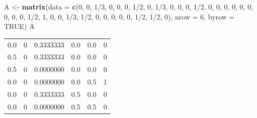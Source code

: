 \documentclass[]{article}
\newenvironment{Shaded}{\begin{snugshade}}{\end{snugshade}}
\newcommand{\KeywordTok}[1]{\textcolor[rgb]{0.13,0.29,0.53}{\textbf{{#1}}}}
\newcommand{\DataTypeTok}[1]{\textcolor[rgb]{0.13,0.29,0.53}{{#1}}}
\newcommand{\DecValTok}[1]{\textcolor[rgb]{0.00,0.00,0.81}{{#1}}}
\newcommand{\StringTok}[1]{\textcolor[rgb]{0.31,0.60,0.02}{{#1}}}
\newcommand{\OtherTok}[1]{\textcolor[rgb]{0.56,0.35,0.01}{{#1}}}
\newcommand{\NormalTok}[1]{{#1}}
\begin{document}
\begin{Shaded}
\begin{Highlighting}[]
\NormalTok{A <-}\StringTok{ }\KeywordTok{matrix}\NormalTok{(}\DataTypeTok{data =} \KeywordTok{c}\NormalTok{(}\DecValTok{0}\NormalTok{, }\DecValTok{0}\NormalTok{,  }\DecValTok{1}\NormalTok{/}\DecValTok{3}\NormalTok{,  }\DecValTok{0}\NormalTok{,   }\DecValTok{0}\NormalTok{, }\DecValTok{0}\NormalTok{, }
                          \DecValTok{1}\NormalTok{/}\DecValTok{2}\NormalTok{, }\DecValTok{0}\NormalTok{,  }\DecValTok{1}\NormalTok{/}\DecValTok{3}\NormalTok{,  }\DecValTok{0}\NormalTok{,   }\DecValTok{0}\NormalTok{, }\DecValTok{0}\NormalTok{,}
                          \DecValTok{1}\NormalTok{/}\DecValTok{2}\NormalTok{, }\DecValTok{0}\NormalTok{,  }\DecValTok{0}\NormalTok{,    }\DecValTok{0}\NormalTok{,   }\DecValTok{0}\NormalTok{, }\DecValTok{0}\NormalTok{,}
                           \DecValTok{0}\NormalTok{, }\DecValTok{0}\NormalTok{,  }\DecValTok{0}\NormalTok{,    }\DecValTok{0}\NormalTok{,   }\DecValTok{1}\NormalTok{/}\DecValTok{2}\NormalTok{, }\DecValTok{1}\NormalTok{,}
                           \DecValTok{0}\NormalTok{, }\DecValTok{0}\NormalTok{,  }\DecValTok{1}\NormalTok{/}\DecValTok{3}\NormalTok{, }\DecValTok{1}\NormalTok{/}\DecValTok{2}\NormalTok{,   }\DecValTok{0}\NormalTok{, }\DecValTok{0}\NormalTok{,}
                           \DecValTok{0}\NormalTok{, }\DecValTok{0}\NormalTok{,  }\DecValTok{0}\NormalTok{,   }\DecValTok{1}\NormalTok{/}\DecValTok{2}\NormalTok{,  }\DecValTok{1}\NormalTok{/}\DecValTok{2}\NormalTok{, }\DecValTok{0}\NormalTok{), }
                  \DataTypeTok{nrow =} \DecValTok{6}\NormalTok{,  }\DataTypeTok{byrow =} \OtherTok{TRUE}\NormalTok{)}
\NormalTok{A}
\end{Highlighting}
\end{Shaded}

\begin{longtable}[]{@{}rrrrrr@{}}
\toprule
0.0 & 0 & 0.3333333 & 0.0 & 0.0 & 0\tabularnewline
0.5 & 0 & 0.3333333 & 0.0 & 0.0 & 0\tabularnewline
0.5 & 0 & 0.0000000 & 0.0 & 0.0 & 0\tabularnewline
0.0 & 0 & 0.0000000 & 0.0 & 0.5 & 1\tabularnewline
0.0 & 0 & 0.3333333 & 0.5 & 0.0 & 0\tabularnewline
0.0 & 0 & 0.0000000 & 0.5 & 0.5 & 0\tabularnewline
\bottomrule
\end{longtable}

\begin{Shaded}
\end{Shaded}
\end{document}
